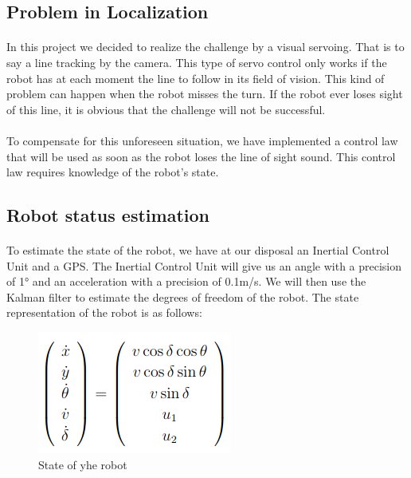\subsection{Problem in Localization}
\paragraph{}In this project we decided to realize the challenge by a visual servoing. That is to say a line tracking by the camera. This type of servo control only works if the robot has at each moment the line to follow in its field of vision. This kind of problem can happen when the robot misses the turn. If the robot ever loses sight of this line, it is obvious that the challenge will not be successful. 

\paragraph{}To compensate for this unforeseen situation, we have implemented a control law that will be used as soon as the robot loses the line of sight sound. This control law requires knowledge of the robot's state.

\subsection{Robot status estimation}

\paragraph{}To estimate the state of the robot, we have at our disposal an Inertial Control Unit and a GPS.
The Inertial Control Unit will give us an angle with a precision of 1° and an acceleration with a precision of 0.1m/s. 
We will then use the Kalman filter to estimate the degrees of freedom of the robot.
The state representation of the robot is as follows:

\begin{figure}[!ht]
    \begin{center}
        \includegraphics[scale=0.6]{Images/Etat_tricycle.png}
    \end{center}
    \caption{State of yhe robot}
    \label{fig:State}
\end{figure}

